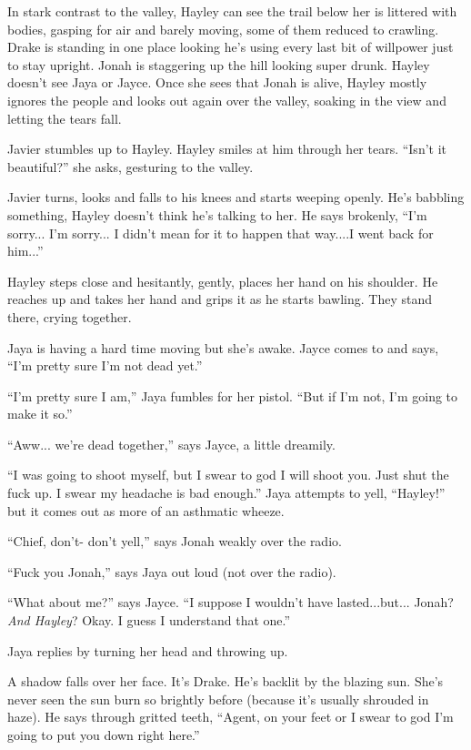 In stark contrast to the valley, Hayley can see the trail below her is littered with bodies, gasping for air and barely moving, some of them reduced to crawling.  Drake is standing in one place looking he's using every last bit of willpower just to stay upright.  Jonah is staggering up the hill looking super drunk.  Hayley doesn't see Jaya or Jayce.  Once she sees that Jonah is alive, Hayley mostly ignores the people and looks out again over the valley, soaking in the view and letting the tears fall. 

Javier stumbles up to Hayley.  Hayley smiles at him through her tears.  ``Isn't it beautiful?'' she asks, gesturing to the valley.  

Javier turns, looks and falls to his knees and starts weeping openly.  He's babbling something, Hayley doesn't think he's talking to her.  He says brokenly, ``I'm sorry... I'm sorry... I didn't mean for it to happen that way....I went back for him...''  

Hayley steps close and hesitantly, gently, places her hand on his shoulder.  He reaches up and takes her hand and grips it as he starts bawling.  They stand there, crying together.



Jaya is having a hard time moving but she's awake.  Jayce comes to and says, ``I'm pretty sure I'm not dead yet.''

``I'm pretty sure I am,'' Jaya fumbles for her pistol. ``But if I'm not, I'm going to make it so.''

``Aww... we're dead together,'' says Jayce, a little dreamily.

``I was going to shoot myself, but I swear to god I will shoot you.  Just shut the fuck up.  I swear my headache is bad enough.''  Jaya attempts to yell, ``Hayley!'' but it comes out as more of an asthmatic wheeze.

``Chief, don't- don't yell,'' says Jonah weakly over the radio.

``Fuck you Jonah,'' says Jaya out loud (not over the radio).

``What about me?'' says Jayce.  ``I suppose I wouldn't have lasted...but... Jonah?  \textit{And Hayley}?  Okay.  I guess I understand that one.''

Jaya replies by turning her head and throwing up.

A shadow falls over her face.  It's Drake.  He's backlit by the blazing sun.  She's never seen the sun burn so brightly before (because it's usually shrouded in haze).   He says through gritted teeth, ``Agent, on your feet or I swear to god I'm going to put you down right here.''


